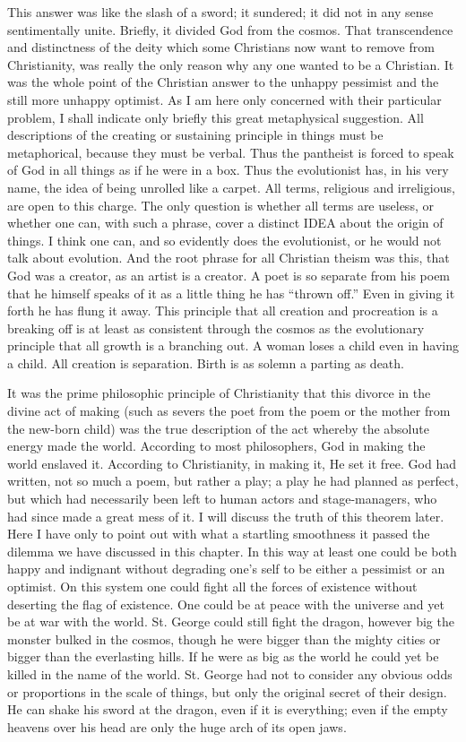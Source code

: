 This answer was like the slash of a sword; it sundered; it did not in any sense sentimentally unite. Briefly, it divided God from the cosmos. That transcendence and distinctness of the deity which some Christians now want to remove from Christianity, was really the only reason why any one wanted to be a Christian. It was the whole point of the Christian answer to the unhappy pessimist and the still more unhappy optimist. As I am here only concerned with their particular problem, I shall indicate only briefly this great metaphysical suggestion. All descriptions of the creating or sustaining principle in things must be metaphorical, because they must be verbal. Thus the pantheist is forced to speak of God in all things as if he were in a box. Thus the evolutionist has, in his very name, the idea of being unrolled like a carpet. All terms, religious and irreligious, are open to this charge. The only question is whether all terms are useless, or whether one can, with such a phrase, cover a distinct IDEA about the origin of things. I think one can, and so evidently does the evolutionist, or he would not talk about evolution. And the root phrase for all Christian theism was this, that God was a creator, as an artist is a creator. A poet is so separate from his poem that he himself speaks of it as a little thing he has “thrown off.” Even in giving it forth he has flung it away. This principle that all creation and procreation is a breaking off is at least as consistent through the cosmos as the evolutionary principle that all growth is a branching out. A woman loses a child even in having a child. All creation is separation. Birth is as solemn a parting as death.

It was the prime philosophic principle of Christianity that this divorce in the divine act of making (such as severs the poet from the poem or the mother from the new-born child) was the true description of the act whereby the absolute energy made the world. According to most philosophers, God in making the world enslaved it. According to Christianity, in making it, He set it free. God had written, not so much a poem, but rather a play; a play he had planned as perfect, but which had necessarily been left to human actors and stage-managers, who had since made a great mess of it. I will discuss the truth of this theorem later. Here I have only to point out with what a startling smoothness it passed the dilemma we have discussed in this chapter. In this way at least one could be both happy and indignant without degrading one’s self to be either a pessimist or an optimist. On this system one could fight all the forces of existence without deserting the flag of existence. One could be at peace with the universe and yet be at war with the world. St. George could still fight the dragon, however big the monster bulked in the cosmos, though he were bigger than the mighty cities or bigger than the everlasting hills. If he were as big as the world he could yet be killed in the name of the world. St. George had not to consider any obvious odds or proportions in the scale of things, but only the original secret of their design. He can shake his sword at the dragon, even if it is everything; even if the empty heavens over his head are only the huge arch of its open jaws.

